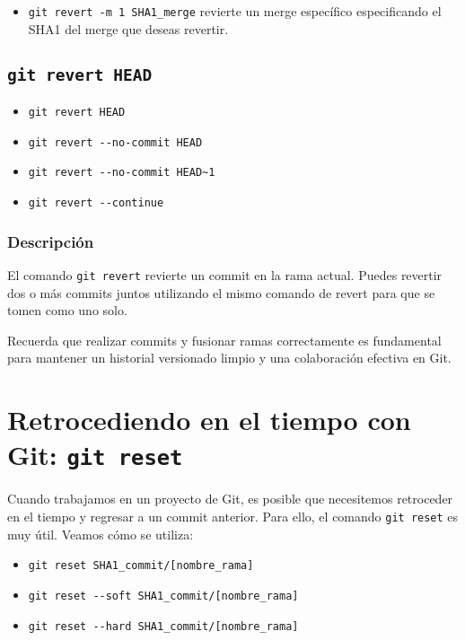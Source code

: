 \documentclass[
  a4paper,
]{article}
\providecommand{\tightlist}{%
  \setlength{\itemsep}{0pt}\setlength{\parskip}{0pt}}\usepackage{longtable,booktabs,array}
\begin{document}
\begin{itemize}
\tightlist
\item
  \texttt{git\ revert\ -m\ 1\ SHA1\_merge} revierte un merge específico
  especificando el SHA1 del merge que deseas revertir.
\end{itemize}

\subsection{\texorpdfstring{\texttt{git\ revert\ HEAD}}{git revert HEAD}}\label{git-revert-head}

\begin{itemize}
\tightlist
\item
  \texttt{git\ revert\ HEAD}
\item
  \texttt{git\ revert\ -\/-no-commit\ HEAD}
\item
  \texttt{git\ revert\ -\/-no-commit\ HEAD\textasciitilde{}1}
\item
  \texttt{git\ revert\ -\/-continue}
\end{itemize}

\subsubsection{Descripción}\label{descripciuxf3n-1}

El comando \texttt{git\ revert} revierte un commit en la rama actual.
Puedes revertir dos o más commits juntos utilizando el mismo comando de
revert para que se tomen como uno solo.

Recuerda que realizar commits y fusionar ramas correctamente es
fundamental para mantener un historial versionado limpio y una
colaboración efectiva en Git.

\section{\texorpdfstring{Retrocediendo en el tiempo con Git:
\texttt{git\ reset}}{Retrocediendo en el tiempo con Git: git reset}}\label{retrocediendo-en-el-tiempo-con-git-git-reset}

Cuando trabajamos en un proyecto de Git, es posible que necesitemos
retroceder en el tiempo y regresar a un commit anterior. Para ello, el
comando \texttt{git\ reset} es muy útil. Veamos cómo se utiliza:

\begin{itemize}
\item
  \texttt{git\ reset\ SHA1\_commit/{[}nombre\_rama{]}}
\item
  \texttt{git\ reset\ -\/-soft\ SHA1\_commit/{[}nombre\_rama{]}}
\item
  \texttt{git\ reset\ -\/-hard\ SHA1\_commit/{[}nombre\_rama{]}}
\end{itemize}
\end{document}
